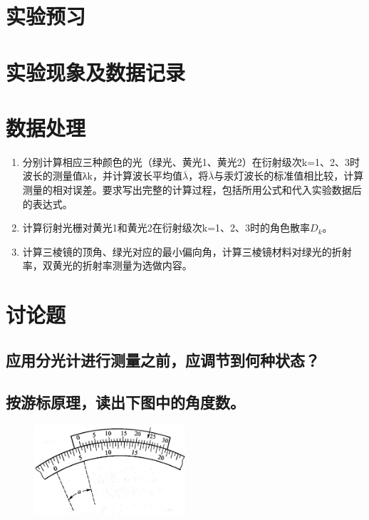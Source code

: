 \documentclass[signature=data]{physicsreport}
\begin{document}
\maketitle
\section{实验预习}
\newpage

\section{实验现象及数据记录}
\makeatletter
{}
\makeatother

\newpage



\section{数据处理}

\begin{enumerate}
    \item 分别计算相应三种颜色的光（绿光、黄光1、黄光2）在衍射级次k=1、2、3时波长的测量值λk，并计算波长平均值$\overline \lambda$，将$\overline \lambda$与汞灯波长的标准值相比较，计算测量的相对误差。要求写出完整的计算过程，包括所用公式和代入实验数据后的表达式。
    \item 计算衍射光栅对黄光1和黄光2在衍射级次k=1、2、3时的角色散率$D_k$。
    \item 计算三棱镜的顶角、绿光对应的最小偏向角，计算三棱镜材料对绿光的折射率，双黄光的折射率测量为选做内容。
\end{enumerate}




\pagebreak
\section{讨论题}

\subsection{应用分光计进行测量之前，应调节到何种状态？}



\subsection{按游标原理，读出下图中的角度数。}

\begin{figure}[H]
    \centering
    \includegraphics[width=0.5\textwidth]{images/lab14/image.png}
    \label{fig:lab13-fig1}
\end{figure}
\end{document}
